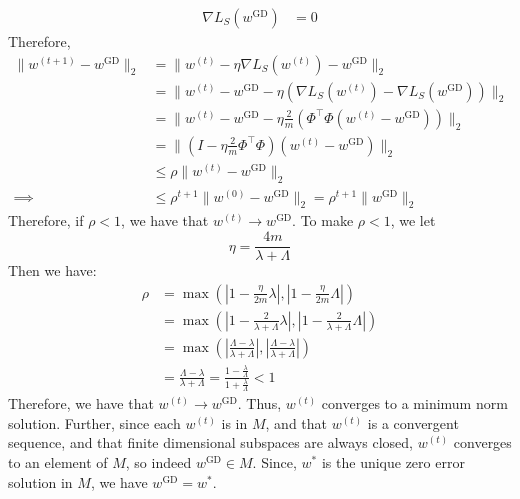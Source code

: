 \documentclass{amsart}
\theoremstyle{definition}
\begin{document}
\begin{enumerate}[(a)]
\begin{align*}
      \nabla L_S(w^{\mathrm{GD}}) &= 0
    \end{align*}
    Therefore, 
    \begin{align*}
      \|w^{(t+1)} - w^{\mathrm{GD}}\|_2 &= \|w^{(t)} - \eta \nabla L_S(w^{(t)}) - w^{\mathrm{GD}}\|_2\\
      &= \|w^{(t)} - w^{\mathrm{GD}} - \eta (\nabla L_S(w^{(t)}) - \nabla L_S(w^{\mathrm{GD}}))\|_2\\
      &= \|w^{(t)} - w^{\mathrm{GD}} - \eta \frac{2}{m}(\Phi^\top\Phi(w^{(t)} - w^{\mathrm{GD}}))\|_2\\
      &= \|(I - \eta \frac{2}{m}\Phi^\top\Phi)(w^{(t)} - w^{\mathrm{GD}})\|_2\\
      & \le \rho \|w^{(t)} - w^{\mathrm{GD}}\|_2\\
      \implies &\le \rho^{t+1} \|w^{(0)} - w^{\mathrm{GD}}\|_2 = \rho^{t+1} \|w^{\mathrm{GD}}\|_2
    \end{align*}
    Therefore, if $\rho < 1$, we have that $w^{(t)} \to w^{\mathrm{GD}}$.
    To make $\rho < 1$, we let 
    \[\eta = \frac{4m}{\lambda + \Lambda}\]
    Then we have:
    \begin{align*}
      \rho &= \max\left(\left|1 - \frac{\eta}{2m} \lambda\right|, \left| 1 - \frac{\eta}{2m}\Lambda \right|\right)\\
      &= \max\left(\left|1 - \frac{2}{\lambda + \Lambda} \lambda\right|, \left| 1 - \frac{2}{\lambda + \Lambda}\Lambda \right|\right)\\
      &= \max\left(\left|\frac{\Lambda - \lambda}{\lambda + \Lambda}\right|, \left| \frac{\Lambda - \lambda}{\lambda + \Lambda} \right|\right)\\
      &= \frac{\Lambda - \lambda}{\lambda + \Lambda} = \frac{1 - \frac{\lambda}{\Lambda}}{1 + \frac{\lambda}{\Lambda}} < 1
    \end{align*}
    Therefore, we have that $w^{(t)} \to w^{\mathrm{GD}}$.
    Thus, $w^{(t)}$ converges to a minimum norm solution. 
    Further, since each $w^{(t)}$ is in $M$, and that $w^{(t)}$ is a convergent sequence, and that finite dimensional subspaces are always closed, 
    $w^{(t)}$ converges to an element of $M$, so indeed $w^{\mathrm{GD}} \in M$. 
    Since, $w^\ast$ is the unique zero error solution in $M$, we have $w^{\mathrm{GD}} = w^\ast$.
\end{enumerate}
\end{document}
